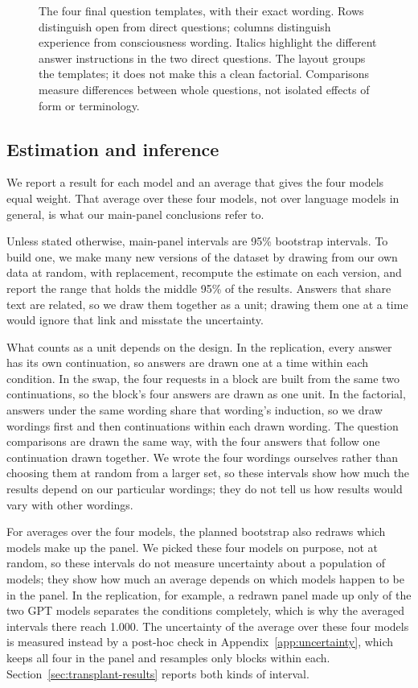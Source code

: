 \documentclass[11pt]{article}
\begin{document}
\begin{figure}[htbp]
\centering

\caption{The four final question templates, with their exact wording.
Rows distinguish open from direct questions; columns distinguish experience
from consciousness wording. Italics highlight the different answer
instructions in the two direct questions. The layout groups the templates;
it does not make this a clean factorial. Comparisons measure differences
between whole questions, not isolated effects of form or terminology.}
\label{fig:query-templates}
\end{figure}

\subsection{Estimation and inference}
\label{sec:estimation}

We report a result for each model and an average that gives the four models
equal weight. That average over these four models, not over language models
in general, is what our main-panel conclusions refer to.

Unless stated otherwise, main-panel intervals are 95\% bootstrap intervals.
To build one, we make many new versions of the dataset by drawing from our
own data at random, with replacement, recompute the estimate on each version,
and report the range that holds the middle 95\% of the results. Answers that
share text are related, so we draw them together as a unit; drawing them one
at a time would ignore that link and misstate the uncertainty.

What counts as a unit depends on the design. In the replication, every answer
has its own continuation, so answers are drawn one at a time within each
condition. In the swap, the four requests in a block are built from the same
two continuations, so the block's four answers are drawn as one unit. In the
factorial, answers under the same wording share that wording's induction, so
we draw wordings first and then continuations within each drawn wording. The
question comparisons are drawn the same way, with the four answers that follow
one continuation drawn together. We wrote the four wordings ourselves rather
than choosing them at random from a larger set, so these intervals show how
much the results depend on our particular wordings; they do not tell us how
results would vary with other wordings.

For averages over the four models, the planned bootstrap also redraws which
models make up the panel. We picked these four models on purpose, not at
random, so these intervals do not measure uncertainty about a population of
models; they show how much an average depends on which models happen to be in
the panel. In the replication, for example, a redrawn panel made up only of
the two GPT models separates the conditions completely, which is why the
averaged intervals there reach 1.000. The uncertainty of the average over
these four models is measured instead by a post-hoc check in
Appendix~\ref{app:uncertainty}, which keeps all four in the panel and
resamples only blocks within each. Section~\ref{sec:transplant-results}
reports both kinds of interval.
\end{document}
